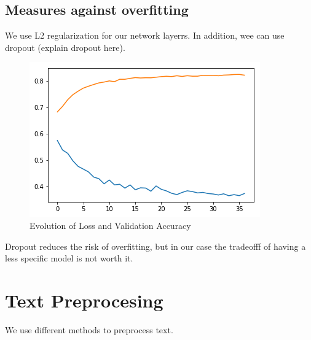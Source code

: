 \documentclass[10pt,conference,compsocconf]{IEEEtran}
\begin{document}
 \subsection{Measures against overfitting}
 We use L2 regularization for our network layerrs. In addition, wee can use dropout (explain dropout here).
 
\begin{figure}[H]
  \centering
  \includegraphics[width=\columnwidth]{overfitting}
  \caption{Evolution of Loss and Validation Accuracy}
  \vspace{-3mm}
  \label{fig:Validation accuracy vs Loss}
\end{figure}
 
 Dropout reduces the risk of overfitting, but in our case the tradeofff of having a less specific model is not worth it.
 

\section{Text Preprocesing}

We use different methods to preprocess text.
\end{document}
